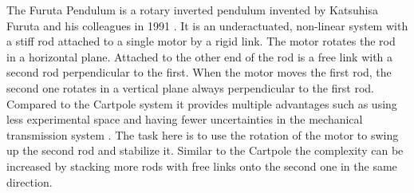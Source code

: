The Furuta Pendulum is a rotary inverted pendulum invented by Katsuhisa Furuta and his colleagues in 1991 \cite{Furuta1991}. It is an underactuated, non-linear system with a stiff rod attached to a single motor by a rigid link. The motor rotates the rod in a horizontal plane. Attached to the other end of the rod is a free link with a second rod perpendicular to the first. When the motor moves the first rod, the second one rotates in a vertical plane always perpendicular to the first rod. Compared to the Cartpole system it provides multiple advantages such as using less experimental space and having fewer uncertainties in the mechanical transmission system \cite{Furuta1991}. The task here is to use the rotation of the motor to swing up the second rod and stabilize it. Similar to the Cartpole the complexity can be increased by stacking more rods with free links onto the second one in the same direction.
